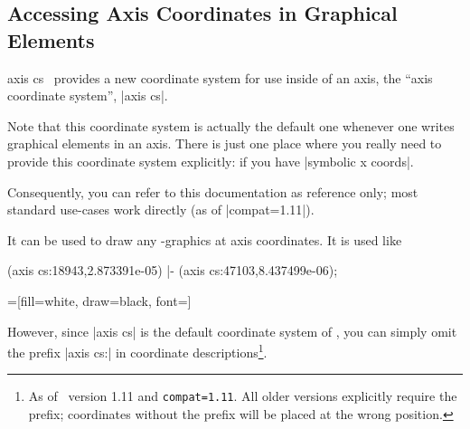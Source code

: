 \subsection{Accessing Axis Coordinates in Graphical Elements}
\label{sec:axis:coords}%
\begin{coordinatesystem}{axis cs}
\PGFPlots\ provides a new coordinate system for use inside of an axis, the ``axis coordinate system'', |axis cs|.

Note that this coordinate system is actually the default one whenever one writes graphical elements in an axis. There is just one place where you really need to provide this coordinate system explicitly:  if you have |symbolic x coords|.

Consequently, you can refer to this documentation as reference only; most standard use-cases work directly (as of |compat=1.11|).

It can be used to draw any \Tikz-graphics at axis coordinates. It is used like
\begin{codeexample}
\draw
   (axis cs:18943,2.873391e-05)
|- (axis cs:47103,8.437499e-06);
\end{codeexample}


\begin{codeexample}[]
=[fill=white,
	draw=black,
	font=\footnotesize]
\end{codeexample}

However, since |axis cs| is the default coordinate system of \PGFPlots, you can simply omit the prefix |axis cs:| in coordinate descriptions\footnote{As of \PGFPlots\ version 1.11 and \verb|compat=1.11|. All older versions explicitly require the prefix; coordinates without the prefix will be placed at the wrong position.}.

\begin{codeexample}[]
\end{codeexample}
\end{coordinatesystem}
